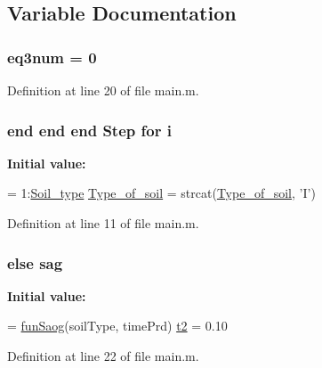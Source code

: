 \subsection{Variable Documentation}
\hypertarget{a00005_a8ecbd124ddcdab7fc367443a82b241af}{}
\subsubsection[{eq3num}]{\setlength{\rightskip}{0pt plus 5cm}eq3num = 0}\label{a00005_a8ecbd124ddcdab7fc367443a82b241af}


Definition at line 20 of file main.\+m.

\hypertarget{a00005_a6dbbc96f4222af2f6c18c8e60f41726b}{}
\subsubsection[{i}]{\setlength{\rightskip}{0pt plus 5cm}end end end Step for i}\label{a00005_a6dbbc96f4222af2f6c18c8e60f41726b}
{\bfseries Initial value\+:}
\begin{DoxyCode}
= 1:\hyperlink{a00038_a6221ae01cf2fb9e8cd22204749785a0e}{Soil\_type}
  \hyperlink{a00005_a3e2c6a7e7b1f0ac68cc462d26373be9b}{Type\_of\_soil} = strcat(\hyperlink{a00005_a3e2c6a7e7b1f0ac68cc462d26373be9b}{Type\_of\_soil}, \textcolor{charliteral}{'I'})
\end{DoxyCode}


Definition at line 11 of file main.\+m.

\hypertarget{a00005_aac9abc95cd2ddc27fa84fb4440b62888}{}
\subsubsection[{sag}]{\setlength{\rightskip}{0pt plus 5cm}else sag}\label{a00005_aac9abc95cd2ddc27fa84fb4440b62888}
{\bfseries Initial value\+:}
\begin{DoxyCode}
= \hyperlink{a00039_a4f60afd2426ee9409955e4352b3f0486}{funSaog}(soilType, timePrd)
  \hyperlink{a00005_a24aeadb733f27244ec14e4cba82eeee9}{t2} = 0.10
\end{DoxyCode}


Definition at line 22 of file main.\+m.

\hypertarget{a00005_a3a318718cf4c9c1380475d059171d8f3}{}
